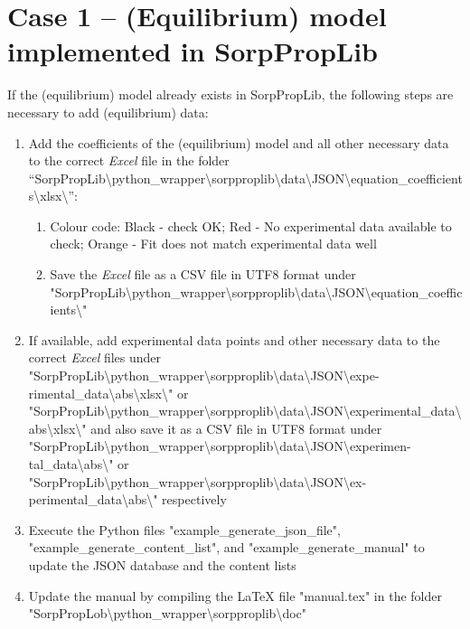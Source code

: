 \section{Case 1 – (Equilibrium) model implemented in SorpPropLib}
\label{cha:extensions:case1}
%
If the (equilibrium) model already exists in SorpPropLib, the following steps are necessary to add (equilibrium) data:
\begin{enumerate}
	\item Add the coefficients of the (equilibrium) model and all other necessary data to the correct \textit{Excel} file in the folder “SorpPropLib\textbackslash python\_wrapper\textbackslash sorpproplib\textbackslash \newline data\textbackslash JSON\textbackslash equation\_coefficients\textbackslash xlsx\textbackslash ”:
	\begin{enumerate}
		\item Colour code: Black - check OK; Red - No experimental data available to check; Orange - Fit does not match experimental data well
		\item Save the \textit{Excel} file as a CSV file in UTF8 format under "SorpPropLib\textbackslash python\_wrapper\textbackslash sorpproplib\textbackslash data\textbackslash JSON\textbackslash equation\_coefficients\textbackslash"
	\end{enumerate}
	\item If available, add experimental data points and other necessary data to the correct \textit{Excel} files under "SorpPropLib\textbackslash python\_wrapper\textbackslash sorpproplib\textbackslash data\textbackslash JSON\textbackslash expe-rimental\_data\textbackslash abs\textbackslash xlsx\textbackslash " or "SorpPropLib\textbackslash python\_wrapper\textbackslash sorpproplib\textbackslash data\textbackslash \newline JSON\textbackslash experimental\_data\textbackslash abs\textbackslash xlsx\textbackslash " and also save it as a CSV file in UTF8 format under "SorpPropLib\textbackslash python\_wrapper\textbackslash sorpproplib\textbackslash data\textbackslash JSON\textbackslash experimen-tal\_data\textbackslash abs\textbackslash " or "SorpPropLib\textbackslash python\_wrapper\textbackslash sorpproplib\textbackslash data\textbackslash JSON\textbackslash ex-perimental\_data\textbackslash abs\textbackslash " respectively
	\item Execute the Python files "example\_generate\_json\_file", "example\_generate\_\newline content\_list", and "example\_generate\_manual" to update the JSON database and the content lists
	\item Update the manual by compiling the LaTeX file "manual.tex" in the folder "SorpPropLob\textbackslash python\_wrapper\textbackslash sorpproplib\textbackslash doc"
\end{enumerate}
